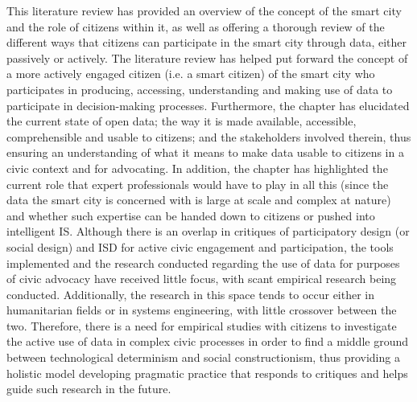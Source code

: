 This literature review has provided an overview of the concept of the smart city and the role of citizens within it, as well as offering a thorough review of the different ways that citizens can participate in the smart city through data, either passively or actively. The literature review has helped put forward the concept of a more actively engaged citizen (i.e. a smart citizen) of the smart city who participates in producing, accessing, understanding and making use of data to participate in decision-making processes. Furthermore, the chapter has elucidated the current state of open data; the way it is made available, accessible, comprehensible and usable to citizens; and the stakeholders involved therein, thus ensuring an understanding of what it means to make data usable to citizens in a civic context and for advocating. In addition, the chapter has highlighted the current role that expert professionals would have to play in all this (since the data the smart city is concerned with is large at scale and complex at nature) and whether such expertise can be handed down to citizens or pushed into intelligent IS. Although there is an overlap in critiques of participatory design (or social design) and ISD for active civic engagement and participation, the tools implemented and the research conducted regarding the use of data for purposes of civic advocacy have received little focus, with scant empirical research being conducted. Additionally, the research in this space tends to occur either in humanitarian fields or in systems engineering, with little crossover between the two. Therefore, there is a need for empirical studies with citizens to investigate the active use of data in complex civic processes in order to find a middle ground between technological determinism and social constructionism, thus providing a holistic model developing pragmatic practice that responds to critiques and helps guide such research in the future.
